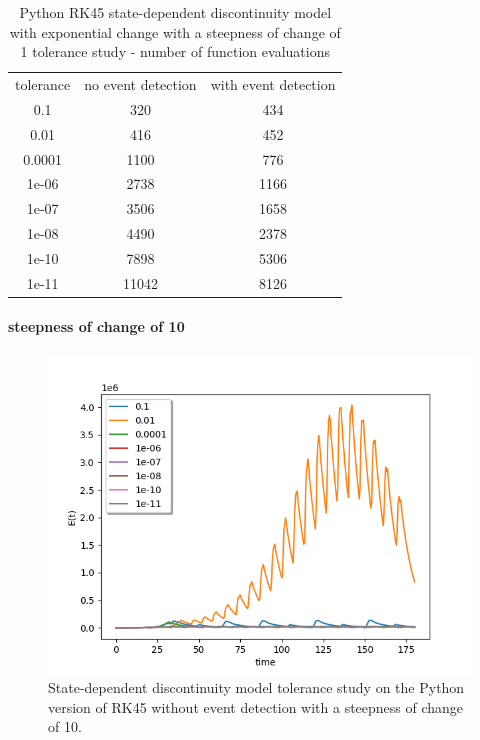 \begin{table}[H]
\caption {Python RK45 state-dependent discontinuity model with exponential change with a steepness of change of 1 tolerance study - number of function evaluations} \label{tab:exp_state_tol_lsoda_1} 
\begin{center}
\begin{tabular}{ c c c }
tolerance & no event detection & with event detection \\ 
0.1 & 320 & 434 \\
0.01 & 416 & 452 \\
0.0001 & 1100 & 776 \\
1e-06 & 2738 & 1166 \\
1e-07 & 3506 & 1658 \\
1e-08 & 4490 & 2378 \\
1e-10 & 7898 & 5306 \\
1e-11 & 11042 & 8126 \\
\end{tabular}
\end{center}
\end{table}



\paragraph{steepness of change of 10}
\begin{figure}[H]
\centering
\includegraphics[width=0.7\linewidth]{./figures/exp_state_tol_rk45_no_event_10}
\caption{State-dependent discontinuity model tolerance study on the Python version of RK45 without event detection with a steepness of change of 10.}
\label{fig:exp_state_tol_rk45_no_event_10}
\end{figure}

